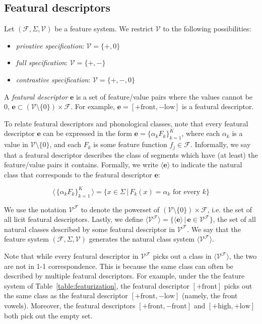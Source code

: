 \documentclass[11pt, oneside]{article}   	%
\begin{document}
\subsection{Featural descriptors}

Let $(\mathcal F, \Sigma, \mathcal V)$ be a feature system. We restrict $\mathcal V$ to the following possibilities: \begin{itemize}
    \item \textit{privative specification}: $\mathcal V = \{ +, 0 \}$
    \item \textit{full specification}: $\mathcal V = \{ +, - \}$
    \item \textit{contrastive specification}: $\mathcal V = \{ +, -, 0 \}$
    \end{itemize}

A \textit{featural descriptor} $\mathbf{e}$ is a set of feature/value pairs where the values cannot be $0$, $\mathbf{e} \subset (\mathcal V \setminus \{0\}) \times \mathcal F$. For example, $\mathbf{e} = [+ \text{front}, - \text{low}]$ is a featural descriptor.

To relate featural descriptors and phonological classes, note that every featural descriptor $\mathbf{e}$ can be expressed in the form $\mathbf{e} = \{\alpha_k F_k\}_{k=1}^K$, where each $\alpha_k$ is a value in $\mathcal V \setminus \{ 0 \}$, and each $F_k$ is some feature function $f_j \in \mathcal F$. Informally, we say that a featural descriptor describes the class of segments which have (at least) the feature/value pairs it contains. Formally, we write $\langle \mathbf{e} \rangle$ to indicate the natural class that corresponds to the featural descriptor $\mathbf{e}$:

$$ \langle \, \{\alpha_k F_k\}_{k=1}^K \, \rangle = \{x \in \Sigma \, | \, F_k(x) = \alpha_k \text{ for every } k \} $$

\vspace{\baselineskip} \noindent We use the notation $\mathcal V^\mathcal F$ to denote the powerset of $(\mathcal V \setminus \{0\}) \times \mathcal F$, i.e. the set of all licit featural descriptors. Lastly, we define $\langle \mathcal V^\mathcal F \rangle = \{ \langle \mathbf{e} \rangle \, | \, \mathbf{e} \in \mathcal V^\mathcal F \}$, the set of all natural classes described by some featural descriptor in $\mathcal V^\mathcal F$. We say that the feature system $(\mathcal F, \Sigma, \mathcal V)$ generates the natural class system $\langle \mathcal V^\mathcal F \rangle$.

Note that while every featural descriptor in $\mathcal V^\mathcal F$ picks out a class in $\langle \mathcal V^\mathcal F \rangle$, the two are not in 1-1 correspondence. This is because the same class can often be described by multiple featural descriptors. For example, under the the feature system of Table~\ref{table:featurization}, the featural descriptor $[+\text{front}]$ picks out the same class as the featural descriptor $[+ \text{front}, - \text{low}]$ (namely, the front vowels). Moreover, the featural descriptors $[+\text{front}, -\text{front}]$ and $[+\text{high}, +\text{low}]$ both pick out the empty set.
\end{document}
